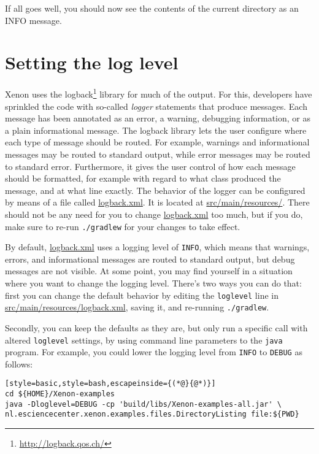 If all goes well, you should now see the contents of the current directory as an INFO message.


\section{Setting the log level}
\label{sec:setting-the-log-level-command-line}

Xenon uses the logback\footnote{\url{http://logback.qos.ch/}} library for much of the output. For this, developers have sprinkled the code with so-called \textit{logger} statements that produce messages. Each message has been annotated as an error, a warning, debugging information, or as a plain informational message. The logback library lets the user configure where each type of message should be routed. For example, warnings and informational messages may be routed to standard output, while error messages may be routed to standard error. Furthermore, it gives the user control of how each message should be formatted, for example with regard to what class produced the message, and at what line exactly. The behavior of the logger can be configured by means of a file called \url{logback.xml}. It is located at \url{src/main/resources/}. There should not be any need for you to change \url{logback.xml} too much, but if you do, make sure to re-run \texttt{./gradlew} for your changes to take effect.

By default, \url{logback.xml} uses a logging level of \texttt{INFO}, which means that warnings, errors, and informational messages are routed to standard output, but debug messages are not visible. At some point, you may find yourself in a situation where you want to change the logging level. There's two ways you can do that: first you can change the default behavior by editing the \texttt{loglevel} line in \url{src/main/resources/logback.xml}, saving it, and re-running \texttt{./gradlew}.

Secondly, you can keep the defaults as they are, but only run a specific call with altered \texttt{loglevel} settings, by using command line parameters to the \texttt{java} program. For example, you could lower the logging level from \texttt{INFO} to \texttt{DEBUG} as follows:

\begin{lstlisting}[style=basic,style=bash,escapeinside={(*@}{@*)}]
cd ${HOME}/Xenon-examples
java -Dloglevel=DEBUG -cp 'build/libs/Xenon-examples-all.jar' \
nl.esciencecenter.xenon.examples.files.DirectoryListing file:${PWD}
\end{lstlisting} %

